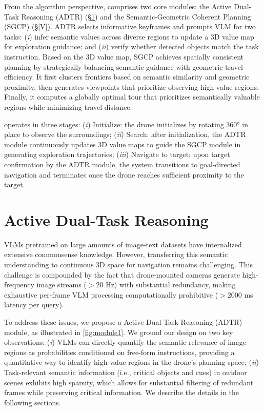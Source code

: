 From the algorithm perspective, \sysname comprises two core modules: the Active Dual-Task Reasoning (ADTR) (\S\ref{IV}) and the Semantic-Geometric Coherent Planning (SGCP) (\S\ref{V}).
ADTR selects informative keyframes and prompts VLM for two tasks: (\textit{i}) infer semantic values across diverse regions to update a 3D value map for exploration guidance; and (\textit{ii}) verify whether detected objects match the task instruction.
Based on the 3D value map, SGCP achieves spatially consistent planning by strategically balancing semantic guidance with geometric travel efficiency.
It first clusters frontiers based on semantic similarity and geometric proximity, then generates viewpoints that prioritize observing high-value regions. Finally, it computes a globally optimal tour that prioritizes semantically valuable regions while minimizing travel distance.


\sysname operates in three stages: (\textit{i}) Initialize: the drone initializes by rotating 360° in place to observe the surroundings; (\textit{ii}) Search: after initialization, the ADTR module continuously updates 3D value maps to guide the SGCP module in generating exploration trajectories; (\textit{iii}) Navigate to target: upon target confirmation by the ADTR module, the system transitions to goal-directed navigation and terminates once the drone reaches sufficient proximity to the target.


\section{Active Dual-Task Reasoning}\label{IV}
VLMs pretrained on large amounts of image-text datasets have internalized extensive commonsense knowledge. However, transferring this semantic understanding to continuous 3D space for navigation remains challenging. This challenge is compounded by the fact that drone-mounted cameras generate high-frequency image streams ($>$20 Hz) with substantial redundancy, making exhaustive per-frame VLM processing computationally prohibitive ($>$2000 ms latency per query).

To address these issues, we propose a Active Dual-Task Reasoning (ADTR) module, as illustrated in \fig\ref{fig:module1}. We ground our design on two key observations: 
(\textit{i}) VLMs can directly quantify the semantic relevance of image regions as probabilities conditioned on free-form instructions, providing a quantitative way to identify high-value regions in the drone's planning space; (\textit{ii}) Task-relevant semantic information (i.e., critical objects and cues) in outdoor scenes exhibits high sparsity, which allows for substantial filtering of redundant frames while preserving critical information. We describe the details in the following sections.


